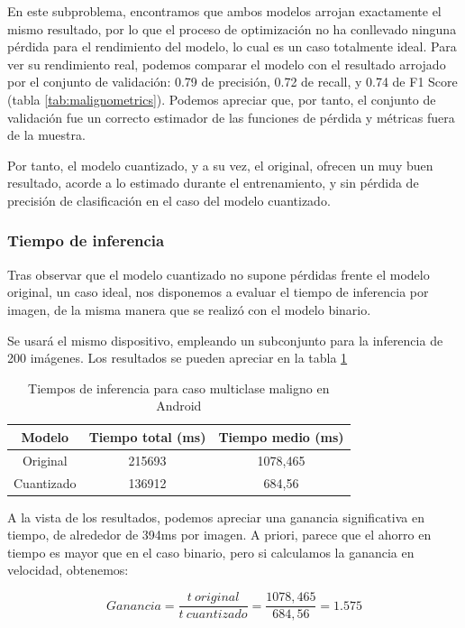 En este subproblema, encontramos que ambos modelos arrojan exactamente el mismo resultado, por lo que el proceso de optimización no ha conllevado ninguna pérdida para el rendimiento del modelo, lo cual es un caso totalmente ideal. Para ver su rendimiento real, podemos comparar el modelo con el resultado arrojado por el conjunto de validación:  0.79 de precisión,  0.72 de recall, y  0.74 de F1 Score (tabla \ref{tab:malignometrics}).  Podemos apreciar que, por tanto, el conjunto de validación fue un correcto estimador de las funciones de pérdida y métricas fuera de la muestra.

Por tanto, el modelo cuantizado, y a su vez, el original, ofrecen un muy buen resultado, acorde a lo estimado durante el entrenamiento, y sin pérdida de precisión de clasificación en el caso del modelo cuantizado. 

\subsubsection{Tiempo de inferencia}

Tras observar que el modelo cuantizado no supone pérdidas frente el modelo original, un caso ideal, nos disponemos a evaluar el tiempo de inferencia por imagen, de la misma manera que se realizó con el modelo binario.

Se usará el mismo dispositivo, empleando un subconjunto para la inferencia de 200 imágenes. Los resultados se pueden apreciar en la tabla \ref{infmal}

\begin{table}[H]
	\centering
	\begin{tabular}{|c|c|c|}
		\hline
		Modelo & Tiempo total (ms) & Tiempo medio (ms) \\ \hline
		Original & 215693 & 1078,465	 \\ \hline
		Cuantizado & 136912 & 684,56 \\ \hline
	\end{tabular}
	\caption{Tiempos de inferencia para caso multiclase maligno en Android}
	\label{infmal}
\end{table}

A la vista de los resultados, podemos apreciar una ganancia significativa en tiempo, de alrededor de 394ms por imagen. A priori, parece que el ahorro en tiempo es mayor que en el caso binario, pero si calculamos la ganancia en velocidad, obtenemos:

$$Ganancia = \frac{t\ original}{t\ cuantizado} = \frac{1078,465}{684,56} = 1.575$$

